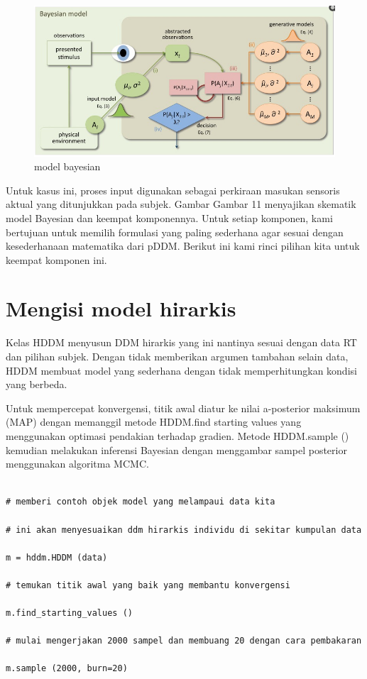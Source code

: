 	\begin{figure}
	\centerline{\includegraphics[width=1\textwidth]{figures/bayesian.PNG}}
	\caption{model bayesian}
	\label{bayesian}
	\end{figure}

Untuk kasus ini, proses input digunakan sebagai perkiraan masukan sensoris aktual yang ditunjukkan pada subjek. Gambar Gambar 11 menyajikan skematik model Bayesian dan keempat komponennya. Untuk setiap komponen, kami bertujuan untuk memilih formulasi yang paling sederhana agar sesuai dengan kesederhanaan matematika dari pDDM. Berikut ini kami rinci pilihan kita untuk keempat komponen ini.

\section {Mengisi model hirarkis}
Kelas HDDM menyusun DDM hirarkis yang ini nantinya sesuai dengan data RT dan pilihan subjek. 
Dengan tidak memberikan argumen tambahan selain data, HDDM membuat model yang sederhana dengan tidak memperhitungkan kondisi yang  berbeda. 

Untuk mempercepat konvergensi, titik awal diatur ke nilai a-posterior maksimum (MAP) dengan memanggil metode HDDM.find starting values yang menggunakan optimasi pendakian terhadap gradien. 
Metode HDDM.sample () kemudian melakukan inferensi Bayesian dengan menggambar sampel posterior menggunakan algoritma MCMC.

\begin{verbatim}

# memberi contoh objek model yang melampaui data kita

# ini akan menyesuaikan ddm hirarkis individu di sekitar kumpulan data

m = hddm.HDDM (data)

# temukan titik awal yang baik yang membantu konvergensi

m.find_starting_values ()

# mulai mengerjakan 2000 sampel dan membuang 20 dengan cara pembakaran

m.sample (2000, burn=20)

\end{verbatim}

